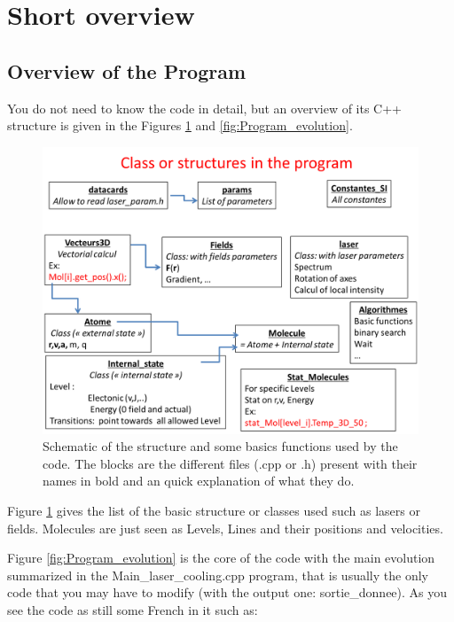 \documentclass[amsmath,amssymb,nofootinbib]{revtex4-2}
\begin{document}










\section{Short overview}

\subsection{Overview of the Program}

You do not need to know the code in detail, but an overview of its C++ structure is given in the Figures  \ref{fig:Class} and \ref{fig:Program_evolution}.


\begin{figure}
	\centering
	\includegraphics[width=0.7\linewidth]{classes}
	\caption{Schematic of the structure and some basics functions used by the code. The blocks are the different files (.cpp or .h) present with their names in bold and an quick explanation of what they do.}
	\label{fig:Class}
\end{figure}


Figure \ref{fig:Class} gives the list of the basic structure or classes used such as lasers or fields. Molecules are just seen as Levels, Lines and their positions and velocities.

Figure \ref{fig:Program_evolution} is the core of the code with the main evolution summarized in the Main\_laser\_cooling.cpp program, that is usually the only code that you may have to modify (with the output one: sortie\_donnee).
As you see the code as still some French in it such as:
\
\end{document}
